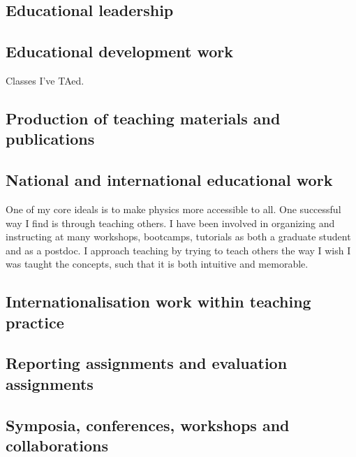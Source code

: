 \subsection{Educational leadership \noneyet}\label{ssec:educational-leadership-noneyet}
\subsection{Educational development work}\label{ssec:educational-development-work}

Classes I've TAed.

\subsection{Production of teaching materials and publications}\label{ssec:production-of-teaching-materials-and-publications}
\subsection{National and international educational work \noneyet}\label{ssec:national-and-international-educational-work-noneyet}

One of my core ideals is to make physics more accessible to all. One successful way I find is through teaching others. I have been involved in organizing and instructing at many workshops, bootcamps, tutorials as both a graduate student and as a postdoc. I approach teaching by trying to teach others the way I wish I was taught the concepts, such that it is both intuitive and memorable.

\subsection{Internationalisation work within teaching practice}\label{ssec:internationalisation-work-within-teaching-practice}
\subsection{Reporting assignments and evaluation assignments}\label{ssec:reporting-assignments-and-evaluation-assignments}
\subsection{Symposia, conferences, workshops and collaborations}\label{ssec:symposia-conferences-workshops-and-collaborations}

